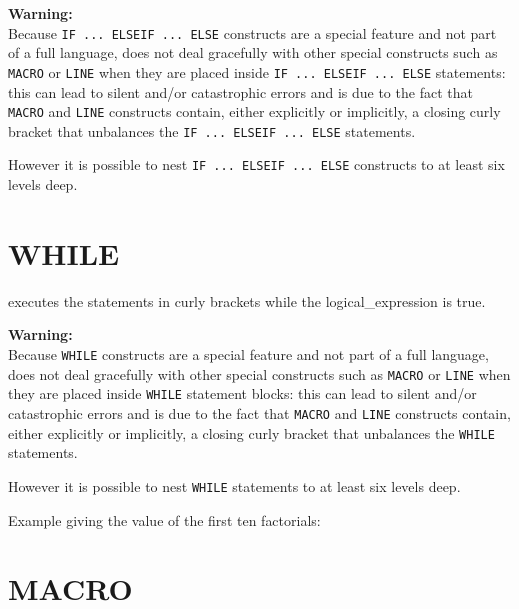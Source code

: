 {\bf Warning:}\\
Because {\tt IF ... ELSEIF ... ELSE} constructs are a \madx special
feature and not part of a full language, \madx does not deal gracefully with 
other special constructs such as {\tt MACRO} or {\tt LINE} when they are placed 
inside {\tt IF ... 
ELSEIF ... ELSE} statements: this can lead to silent and/or catastrophic errors 
and is due to the fact that {\tt MACRO} and {\tt LINE} constructs contain, 
either explicitly or implicitly, a closing curly bracket that unbalances the 
{\tt IF ... ELSEIF ... ELSE} statements.

However it is possible to nest {\tt IF ... ELSEIF ... ELSE} constructs to at 
least six levels deep.


\section{WHILE}
\label{sec:while}
executes the statements in curly brackets while the logical\_expression
is true. 



{\bf Warning:}\\
Because {\tt WHILE} constructs are a \madx special
feature and not part of a full language, \madx does not deal gracefully with 
other special constructs such as {\tt MACRO} or {\tt LINE} when they are placed 
inside {\tt WHILE} statement blocks: this can lead to silent and/or 
catastrophic errors and is due to the 
fact that {\tt MACRO} and {\tt LINE} constructs contain, either explicitly or 
implicitly, a closing curly bracket that unbalances the {\tt WHILE} statements.

However it is possible to nest {\tt WHILE} statements to at least six levels 
deep.


Example giving the value of the first ten factorials:

\section{MACRO}
\label{sec:macro}

